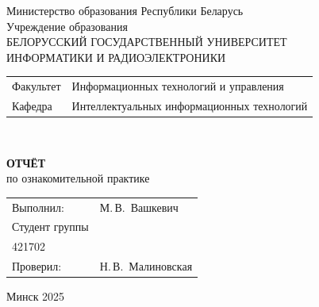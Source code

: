 \begin{titlepage}
  \begin{center}
    Министерство образования Республики Беларусь\\[1em]
    Учреждение образования\\
    БЕЛОРУССКИЙ ГОСУДАРСТВЕННЫЙ УНИВЕРСИТЕТ \\
    ИНФОРМАТИКИ И РАДИОЭЛЕКТРОНИКИ\\[1em]

    \begin{minipage}{\textwidth}
      \begin{flushleft}
        \begin{tabular}{ l l }
          Факультет & Информационных технологий и управления\\
          Кафедра   & Интеллектуальных информационных технологий
        \end{tabular}
      \end{flushleft}
    \end{minipage}\\[1em]

    \vspace{5em}


    \textbf{ОТЧЁТ}\\
    
    {по ознакомительной практике}\\
    \vspace{10em}
    
    \begin{tabular}{ p{}p{} }
      Выполнил:& М.\,В.~Вашкевич \\[1em]
      Студент группы& \\
      421702 & \\
      Проверил: & Н.\,В.~Малиновская \\
     
    \end{tabular}
    
    \vfill
    {\normalsize Минск 2025}
  \end{center}
\end{titlepage}
